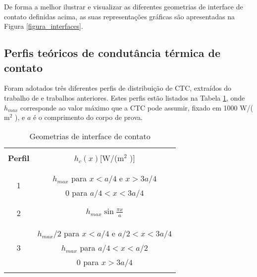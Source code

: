 De forma a melhor ilustrar e visualizar as diferentes geometrias de interface de contato definidas acima, as suas representações gráficas são apresentadas na Figura \ref{figura_interfaces}.
\\



\subsection{Perfis teóricos de condutância térmica de contato}\label{config_ctc}

Foram adotados três diferentes perfis de distribuição de CTC, extraídos do trabalho de \cite{tese_padilha} e trabalhos anteriores. Estes perfis estão listados na Tabela \ref{tabela_ctc}, onde $h_{max}$ corresponde ao valor máximo que a CTC pode assumir, fixado em 1000 W/($\text{m}^2$ \celsius), e $a$ é o comprimento do corpo de prova.
\newpage
\begin{table}[h!b]
	\begin{center}
		\begin{tabular}{c|c}
			\hline \\
			\textbf{Perfil} & $h_c(x)$[W/($\text{m}^2$ \celsius)]  \\ \\ \hline \\
			\multirow{2}{*}{1} & $h_{max}$ para $x < a/4$ e $x > 3a/4$ \\ & 0 para $a/4 < x < 3a/4$ \\ \\ \hline \\
			2 & $h_{max}\sin\displaystyle\frac{\pi x}{a}$ \\ \\ \hline \\
			\multirow{3}{*}{3} & $h_{max}/2$ para $x < a/4$ e $a/2 < x < 3a/4$ \\ & $h_{max}$ para $a/4 < x < a/2$ \\ & 0 para $ x > 3a/4$
			\\ \\ \hline
		\end{tabular}		
	\end{center}
	\caption{Geometrias de interface de contato}
	\label{tabela_ctc}
\end{table}

